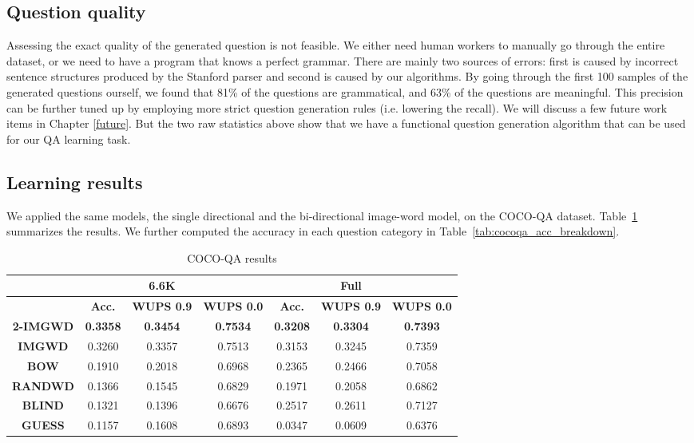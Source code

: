 \subsection{Question quality}
Assessing the exact quality of the generated question is not feasible. We either need human workers to manually go through the entire dataset, or we need to have a program that knows a perfect grammar. There are mainly two sources of errors: first is caused by incorrect sentence structures produced by the Stanford parser and second is caused by our algorithms. By going through the first 100 samples of the generated questions ourself, we found that 81\% of the questions are grammatical, and 63\% of the questions are meaningful. This precision can be further tuned up by employing more strict question generation rules (i.e. lowering the recall). We will discuss a few future work items in Chapter \ref{future}. But the two raw statistics above show that we have a functional question generation algorithm that can be used for our QA learning task.

\subsection{Learning results}
We applied the same models, the single directional and the bi-directional image-word model, on the COCO-QA dataset. Table~\ref{tab:cocoqa_results} summarizes the results. We further computed the accuracy in each question category in Table~\ref{tab:cocoqa_acc_breakdown}.
\begin{table}[h]
\centering
\caption{COCO-QA results}
\label{tab:cocoqa_results}
\begin{tabular}{c c c c | c c c}
\toprule
                 &          &\textbf{6.6K}&             &          &\textbf{Full}&           \\
\midrule
                 & \textbf{Acc.}     & \textbf{WUPS 0.9}   & \textbf{WUPS 0.0}       & \textbf{Acc.}     & \textbf{WUPS 0.9}   & \textbf{WUPS 0.0}     \\
\midrule
\textbf{2-IMGWD} & \textbf{0.3358} & \textbf{0.3454} & \textbf{0.7534} & \textbf{0.3208} & \textbf{0.3304} & \textbf{0.7393} \\
\textbf{IMGWD}   & 0.3260   & 0.3357     & 0.7513       & 0.3153   & 0.3245     & 0.7359     \\
\midrule
\textbf{BOW}     & 0.1910   & 0.2018     & 0.6968       & 0.2365   & 0.2466     & 0.7058     \\
\textbf{RANDWD}  & 0.1366   & 0.1545     & 0.6829       & 0.1971   & 0.2058     & 0.6862     \\
\textbf{BLIND}   & 0.1321   & 0.1396     & 0.6676       & 0.2517   & 0.2611     & 0.7127     \\
\textbf{GUESS}   & 0.1157   & 0.1608     & 0.6893       & 0.0347   & 0.0609     & 0.6376      \\
\bottomrule
\end{tabular}
\end{table}

